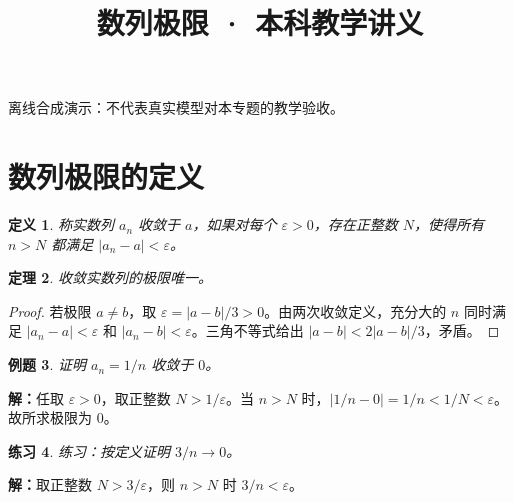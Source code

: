 \documentclass[UTF8,fontset=fandol,11pt]{ctexart}
\title{数列极限 · 本科教学讲义}
\date{}
\newtheorem{definition}{定义}[section]
\newtheorem{theorem}[definition]{定理}
\newtheorem{example}[definition]{例题}
\newtheorem{exercise}[definition]{练习}
\begin{document}
\maketitle
\par\noindent 离线合成演示：不代表真实模型对本专题的教学验收。\par
\section{数列极限的定义}
\begin{definition}
称实数列 $a_n$ 收敛于 $a$，如果对每个 $\varepsilon>0$，存在正整数 $N$，使得所有 $n>N$ 都满足 $|a_n-a|<\varepsilon$。
\end{definition}
\begin{theorem}
收敛实数列的极限唯一。
\end{theorem}
\begin{proof}
若极限 $a\ne b$，取 $\varepsilon=|a-b|/3>0$。由两次收敛定义，充分大的 $n$ 同时满足 $|a_n-a|<\varepsilon$ 和 $|a_n-b|<\varepsilon$。三角不等式给出 $|a-b|<2|a-b|/3$，矛盾。
\end{proof}
\begin{example}
证明 $a_n=1/n$ 收敛于 $0$。
\end{example}
\par\noindent\textbf{解：}任取 $\varepsilon>0$，取正整数 $N>1/\varepsilon$。当 $n>N$ 时，$|1/n-0|=1/n<1/N<\varepsilon$。故所求极限为 $0$。\par
\begin{exercise}
练习：按定义证明 $3/n\to0$。
\end{exercise}
\par\noindent\textbf{解：}取正整数 $N>3/\varepsilon$，则 $n>N$ 时 $3/n<\varepsilon$。\par
\end{document}
